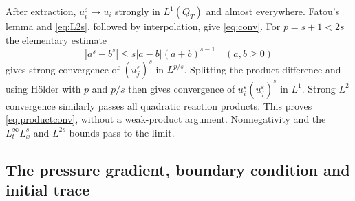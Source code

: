 \documentclass[11pt]{article}
\newcommand{\eps}{\varepsilon}
\begin{document}
After extraction, $u_i^\eps\to u_i$ strongly in $L^1(Q_T)$ and almost
everywhere. Fatou's lemma and \eqref{eq:L2s}, followed by interpolation,
give \eqref{eq:conv}. For $p=s+1<2s$ the elementary estimate
\[
 |a^s-b^s|\leq s|a-b|(a+b)^{s-1}\quad(a,b\geq0)
\]
gives strong convergence of $(u_j^\eps)^s$ in $L^{p/s}$.
Splitting the product difference and using H\"older with $p$ and $p/s$
then gives convergence of $u_i^\eps(u_j^\eps)^s$ in $L^1$.
Strong $L^2$ convergence similarly passes all quadratic reaction products.
This proves \eqref{eq:productconv}, without a weak-product argument.
Nonnegativity and the $L^\infty_tL^s_x$ and $L^{2s}$ bounds pass to the limit.

\subsection{The pressure gradient, boundary condition and initial trace}
\end{document}
